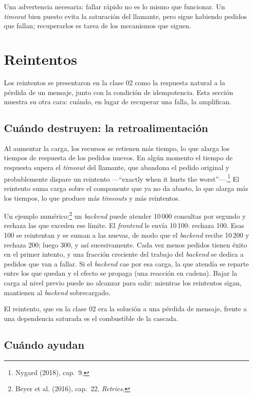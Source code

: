\documentclass[variant=apuntes,cover=institutional,mode=screen]{ua-engineering-v6-article}
\begin{document}
Una advertencia necesaria: fallar rápido no es lo mismo que funcionar. Un \emph{timeout} bien puesto evita la saturación del llamante, pero sigue habiendo pedidos que fallan; recuperarlos es tarea de los mecanismos que siguen.

\section{Reintentos}\label{sec:reintentos}

Los reintentos se presentaron en la clase 02 como la respuesta natural a la pérdida de un mensaje, junto con la condición de idempotencia. Esta sección muestra su otra cara: cuándo, en lugar de recuperar una falla, la amplifican.

\subsection{Cuándo destruyen: la retroalimentación}

Al aumentar la carga, los recursos se retienen más tiempo, lo que alarga los tiempos de respuesta de los pedidos nuevos. En algún momento el tiempo de respuesta supera el \emph{timeout} del llamante, que abandona el pedido original y probablemente dispare un reintento ---``exactly when it hurts the worst''---.\footnote{Nygard (2018), cap.~9.} El reintento suma carga sobre el componente que ya no da abasto, lo que alarga más los tiempos, lo que produce más \emph{timeouts} y más reintentos.

Un ejemplo numérico:\footnote{Beyer et al. (2016), cap.~22, \emph{Retries}.} un \emph{backend} puede atender 10\,000 consultas por segundo y rechaza las que exceden ese límite. El \emph{frontend} le envía 10\,100: rechaza 100. Esas 100 se reintentan y se suman a las nuevas, de modo que el \emph{backend} recibe 10\,200 y rechaza 200; luego 300, y así sucesivamente. Cada vez menos pedidos tienen éxito en el primer intento, y una fracción creciente del trabajo del \emph{backend} se dedica a pedidos que van a fallar. Si el \emph{backend} cae por esa carga, la que atendía se reparte entre los que quedan y el efecto se propaga (una reacción en cadena). Bajar la carga al nivel previo puede no alcanzar para salir: mientras los reintentos sigan, mantienen al \emph{backend} sobrecargado.

El reintento, que en la clase 02 era la solución a una pérdida de mensaje, frente a una dependencia saturada es el combustible de la cascada.

\subsection{Cuándo ayudan}
\end{document}
